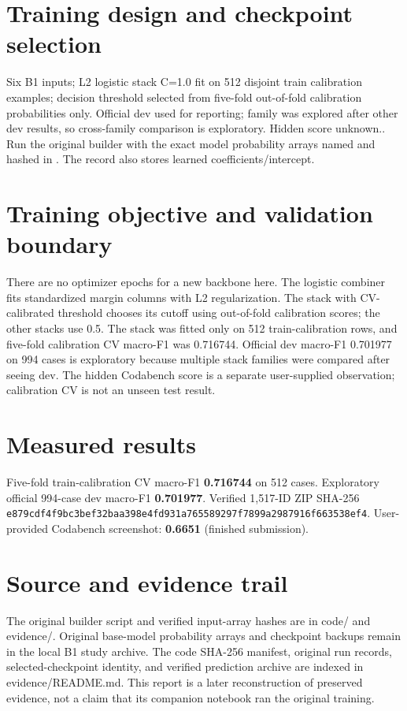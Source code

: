 \documentclass[11pt,a4paper]{article}
\begin{document}
\section{Training design and checkpoint selection}
Six B1 inputs; L2 logistic stack C=1.0 fit on 512 disjoint train calibration examples; decision threshold selected from five-fold out-of-fold calibration probabilities only. Official dev used for reporting; family was explored after other dev results, so cross-family comparison is exploratory. Hidden score unknown.. Run the original builder  with the exact model probability arrays named and hashed in . The record also stores learned coefficients/intercept.
\section{Training objective and validation boundary}
There are no optimizer epochs for a new backbone here. The logistic combiner fits standardized margin columns with L2 regularization. The stack with CV-calibrated threshold chooses its cutoff using out-of-fold calibration scores; the other stacks use 0.5. The stack was fitted only on 512 train-calibration rows, and five-fold calibration CV macro-F1 was 0.716744. Official dev macro-F1 0.701977 on 994 cases is exploratory because multiple stack families were compared after seeing dev. The hidden Codabench score is a separate user-supplied observation; calibration CV is not an unseen test result.
\begin{minipage}{\linewidth}
\section{Measured results}
Five-fold train-calibration CV macro-F1 \textbf{0.716744} on 512 cases. Exploratory official 994-case dev macro-F1 \textbf{0.701977}. Verified 1,517-ID ZIP SHA-256 \texttt{e879cdf4f9bc3bef}\allowbreak\texttt{32baa398e4fd931a}\allowbreak\texttt{765589297f7899a2}\allowbreak\texttt{987916f663538ef4}. User-provided Codabench screenshot: \textbf{0.6651} (finished submission).
\end{minipage}
\section{Source and evidence trail}
The original builder script and verified input-array hashes are in code/ and evidence/. Original base-model probability arrays and checkpoint backups remain in the local B1 study archive. The code SHA-256 manifest, original run records, selected-checkpoint identity, and verified prediction archive are indexed in evidence/README.md. This report is a later reconstruction of preserved evidence, not a claim that its companion notebook ran the original training.
\end{document}
